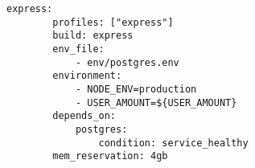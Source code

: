 \begin{lstlisting}[language=docker-compose-2,caption={Express.js Docker Compose configuration},breaklines=true,label={lst:expressDockerCompose}]
    express:
        profiles: ["express"]
        build: express
        env_file:
            - env/postgres.env
        environment:
            - NODE_ENV=production
            - USER_AMOUNT=${USER_AMOUNT}
        depends_on:
            postgres:
                condition: service_healthy
        mem_reservation: 4gb
\end{lstlisting}
